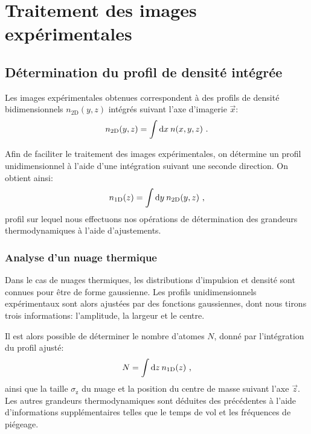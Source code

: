 
\chapter{Traitement des images expérimentales}
\label{ch:anex_mesure_temp}

\section{Détermination du profil de densité intégrée}

Les images expérimentales obtenues correspondent à des profils de densité bidimensionnels $n_{\mathrm{2D}}(y,z)$ intégrés suivant l'axe d'imagerie $\vec{x}$:
\begin{equation}
n_{\mathrm{2D}}(y,z)=\int{\mathop{}\mathopen{}\mathrm{d}x \: n(x,y,z)} \text{ .}
\end{equation}

Afin de faciliter le traitement des images expérimentales, on détermine un profil unidimensionnel à l'aide d'une intégration suivant une seconde direction. On obtient ainsi: 
\begin{equation}
n_{\mathrm{1D}}(z)=\int{\mathop{}\mathopen{}\mathrm{d}y \: n_{\mathrm{2D}}(y,z)} \text{ ,}
\end{equation}
profil sur lequel nous effectuons nos opérations de détermination des grandeurs thermodynamiques à l'aide d'ajustements.

\subsection{Analyse d'un nuage thermique}
Dans le cas de nuages thermiques, les distributions d'impulsion et densité sont connues pour être de forme gaussienne. Les profils unidimensionnels expérimentaux sont alors ajustées par des fonctions gaussiennes, dont nous tirons trois informations: l'amplitude, la largeur et le centre. 

Il est alors possible de déterminer le nombre d'atomes $N$, donné par l'intégration du profil ajusté:  
\begin{equation}
N=\int{\mathop{}\mathopen{}\mathrm{d}z \: n_{\mathrm{1D}}(z)} \text{ ,}
\end{equation}
ainsi que la taille $\sigma_{\mathrm{z}}$ du nuage et la position du centre de masse suivant l'axe $\vec{z}$. Les autres grandeurs thermodynamiques sont déduites des précédentes à l'aide d'informations supplémentaires telles que le temps de vol et les fréquences de piégeage. 

